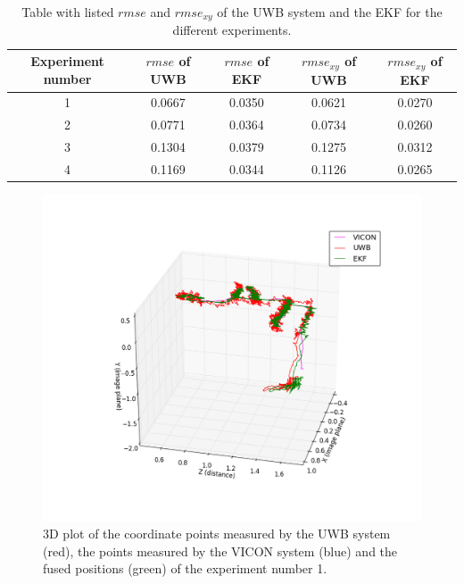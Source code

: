 \begin{table}[ht!]
\begin{center}
\begin{tabular}{c|c|c|c|c}
	Experiment number & $\textit{rmse}$ of \ac{UWB} & $\textit{rmse}$ of \ac{EKF} & $\textit{rmse}_{xy}$ of \ac{UWB} & $\textit{rmse}_{xy}$ of \ac{EKF}\\ 
	\hline 
	1 & 0.0667 & 0.0350 & 0.0621 & 0.0270 \\
	2 & 0.0771 & 0.0364 & 0.0734 & 0.0260 \\
	3 & 0.1304 & 0.0379 & 0.1275 & 0.0312 \\
	4 & 0.1169 & 0.0344 & 0.1126 & 0.0265
\end{tabular}
\end{center}
\caption{Table with listed $\textit{rmse}$ and $\textit{rmse}_{xy}$ of the \ac{UWB} system and the \ac{EKF} for the different experiments.}
\label{tab:results}
\end{table}

\begin{figure}[ht!]\centering
	\includegraphics[width=1.0\textwidth]{figures/evaluation}
	\caption{3D plot of the coordinate points measured by the \ac{UWB} system (red), the points measured by the VICON system (blue) and the fused positions (green) of the experiment number 1.}\label{fig:evaluation}
\end{figure}
